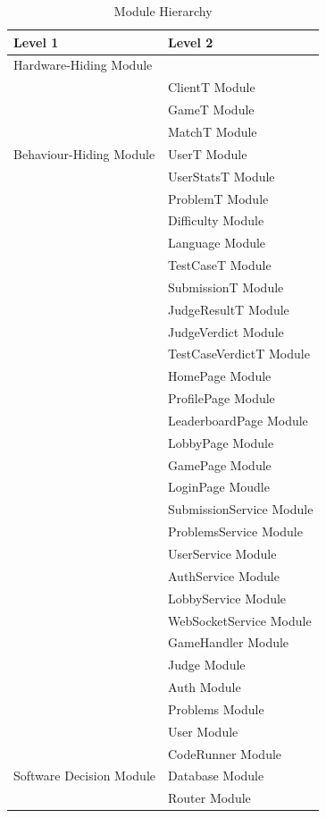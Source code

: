 \documentclass[12pt, titlepage]{article}
\begin{document}
\begin{table}[H]
\centering
\begin{tabular}{p{} p{}}
\toprule
\textbf{Level 1} & \textbf{Level 2}\\
\midrule

{Hardware-Hiding Module} & \\
\midrule

\multirow{7}{0.3\textwidth}{Behaviour-Hiding Module} 
& ClientT Module\\
& GameT Module\\
& MatchT Module\\
& UserT Module\\
& UserStatsT Module\\
& ProblemT Module\\ 
& Difficulty Module\\
& Language Module\\
& TestCaseT Module\\
& SubmissionT Module\\
& JudgeResultT Module\\
& JudgeVerdict Module\\
& TestCaseVerdictT Module\\
& HomePage Module\\
& ProfilePage Module\\
& LeaderboardPage Module\\
& LobbyPage Module\\
& GamePage Module\\
& LoginPage Moudle\\
& SubmissionService Module\\
& ProblemsService Module\\
& UserService Module\\
& AuthService Module\\
& LobbyService Module\\
& WebSocketService Module\\
& GameHandler Module\\
& Judge Module\\
& Auth Module\\
& Problems Module\\
& User Module\\
\midrule

\multirow{3}{0.3\textwidth}{Software Decision Module} & {CodeRunner Module}\\
& Database Module\\
& Router Module\\
\bottomrule

\end{tabular}
\caption{Module Hierarchy}
\label{TblMH}
\end{table}
\end{document}
